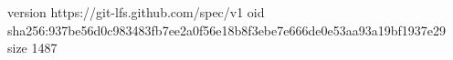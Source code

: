 version https://git-lfs.github.com/spec/v1
oid sha256:937be56d0c983483fb7ee2a0f56e18b8f3ebe7e666de0e53aa93a19bf1937e29
size 1487

